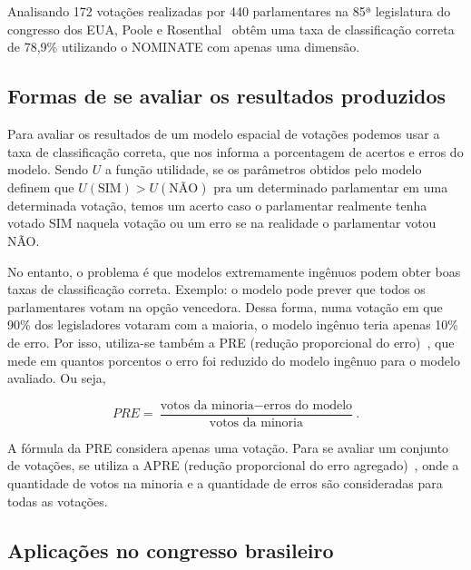 \documentclass[a4paper, 12pt]{article}
\newcommand\nay{NÃO\xspace}
\newcommand\yea{SIM\xspace}
\newcommand\nominate{NOMINATE\xspace}
\begin{document}

Analisando 172 votações realizadas por 440 parlamentares na 85ª legislatura do congresso dos EUA, Poole e Rosenthal~\cite{poole1985nominate} obtêm uma taxa de classificação correta de 78,9\% utilizando o \nominate com apenas uma dimensão.

\subsection*{Formas de se avaliar os resultados produzidos}

Para avaliar os resultados de um modelo espacial de votações podemos usar a taxa de classificação correta, que nos informa a porcentagem de acertos e erros do modelo. Sendo $U$ a função utilidade, se os parâmetros obtidos pelo modelo definem que $U(\textrm{SIM}) > U(\textrm{NÃO})$ pra um determinado parlamentar em uma determinada votação, temos um acerto caso o parlamentar realmente tenha votado \yea naquela votação ou um erro se na realidade o parlamentar votou \nay.

No entanto, o problema é que modelos extremamente ingênuos podem obter boas taxas de classificação correta. Exemplo: o modelo pode prever que todos os parlamentares votam na opção vencedora. Dessa forma, numa votação em que 90\% dos legisladores votaram com a maioria, o modelo ingênuo teria apenas 10\% de erro. Por isso, utiliza-se também a PRE (redução proporcional do erro)~\cite{leoni02cdep}, que mede em quantos porcentos o erro foi reduzido do modelo ingênuo para o modelo avaliado. Ou seja,

\[PRE = \frac{\textrm{votos da minoria} - \textrm{erros do modelo}}{\textrm{votos da minoria}}.\]

A fórmula da PRE considera apenas uma votação. Para se avaliar um conjunto de votações, se utiliza a APRE (redução proporcional do erro agregado)~\cite{leoni02cdep}, onde a quantidade de votos na minoria e a quantidade de erros são consideradas para todas as votações.

\subsection*{Aplicações no congresso brasileiro}
\end{document}
